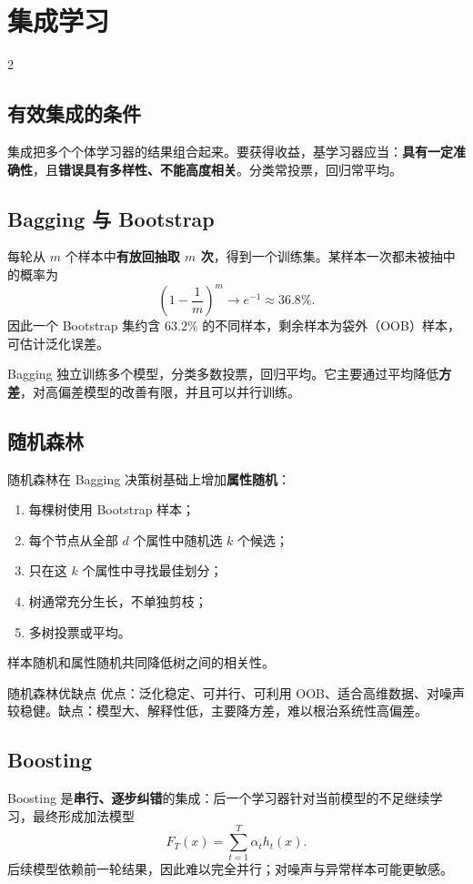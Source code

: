 \documentclass[9pt,a4paper,UTF8]{ctexart}
\begin{document}
\section{集成学习}
\begin{multicols}{2}
\subsection{有效集成的条件}
集成把多个个体学习器的结果组合起来。要获得收益，基学习器应当：\textbf{具有一定准确性}，且\textbf{错误具有多样性、不能高度相关}。分类常投票，回归常平均。

\subsection{Bagging 与 Bootstrap}
每轮从 $m$ 个样本中\textbf{有放回抽取 $m$ 次}，得到一个训练集。某样本一次都未被抽中的概率为
\[
\left(1-\frac1m\right)^m\to e^{-1}\approx36.8\%.
\]
因此一个 Bootstrap 集约含 $63.2\%$ 的不同样本，剩余样本为袋外（OOB）样本，可估计泛化误差。

Bagging 独立训练多个模型，分类多数投票，回归平均。它主要通过平均降低\textbf{方差}，对高偏差模型的改善有限，并且可以并行训练。

\subsection{随机森林}
随机森林在 Bagging 决策树基础上增加\textbf{属性随机}：
\begin{enumerate}
\item 每棵树使用 Bootstrap 样本；
\item 每个节点从全部 $d$ 个属性中随机选 $k$ 个候选；
\item 只在这 $k$ 个属性中寻找最佳划分；
\item 树通常充分生长，不单独剪枝；
\item 多树投票或平均。
\end{enumerate}
样本随机和属性随机共同降低树之间的相关性。

\begin{keybox}{随机森林优缺点}
优点：泛化稳定、可并行、可利用 OOB、适合高维数据、对噪声较稳健。缺点：模型大、解释性低，主要降方差，难以根治系统性高偏差。
\end{keybox}

\subsection{Boosting}
Boosting 是\textbf{串行、逐步纠错}的集成：后一个学习器针对当前模型的不足继续学习，最终形成加法模型
\[
F_T(x)=\sum_{t=1}^{T}\alpha_t h_t(x).
\]
后续模型依赖前一轮结果，因此难以完全并行；对噪声与异常样本可能更敏感。


\end{multicols}
\end{document}
